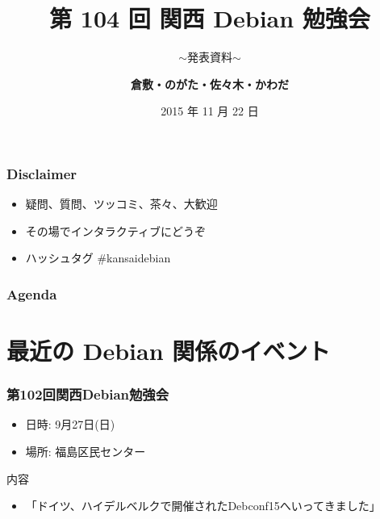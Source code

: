 \documentclass[cjk,dvipdfmx,10pt,compress,%
hyperref={bookmarks=true,bookmarksnumbered=true,bookmarksopen=false,%
colorlinks=false,%
pdftitle={第 104 回 関西 Debian 勉強会},%
pdfauthor={倉敷・のがた・佐々木・かわだ},%
pdfsubject={資料},%
}]{beamer}
\title{第 104 回 関西 Debian 勉強会}
\subtitle{$\sim$発表資料$\sim$}
\author[かわだ てつたろう]{{\large\bf 倉敷・のがた・佐々木・かわだ}}
\institute[Debian JP]{{\normalsize\tt 関西 Debian 勉強会}}
\date{{\small 2015 年 11 月 22 日}}
\begin{document}
\settitleslide
\begin{frame}
\titlepage
\end{frame}
\setdefaultslide

\begin{frame}[fragile]
  \frametitle{Disclaimer}
  \begin{itemize}
  \item 疑問、質問、ツッコミ、茶々、\alert{大歓迎}
  \item その場でインタラクティブにどうぞ
  \item ハッシュタグ \#kansaidebian
  \end{itemize}
\end{frame}

\begin{frame}[fragile]
\frametitle{Agenda}

\tableofcontents

\end{frame}

\section{最近の Debian 関係のイベント}


\begin{frame}[fragile]
  \frametitle{第102回関西Debian勉強会}
  \begin{itemize}
  \item 日時: 9月27日(日)
  \item 場所: 福島区民センター
  \end{itemize}
  \begin{block}{内容}
    \begin{itemize}
    \item 「ドイツ、ハイデルベルクで開催されたDebconf15へいってきました」
    \end{itemize}
  \end{block}
\end{frame}
\end{document}
